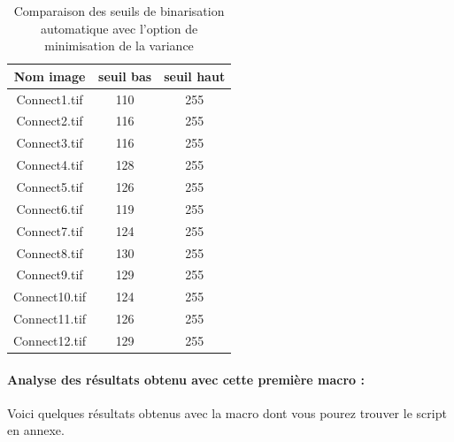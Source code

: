 \documentclass{scrreprt}
\begin{document}
\begin{table}[!h]
        \begin{center}
                \begin{tabular}{|c|c|c|}
                   \hline
                   Nom image & seuil bas & seuil haut \\
                   \hline
                   Connect1.tif & 110  & 255 \\
                   \hline
                   Connect2.tif & 116 & 255  \\
                   \hline
		   Connect3.tif & 116 & 255 \\
                   \hline 
		   Connect4.tif & 128 & 255 \\
                   \hline 
		   Connect5.tif & 126 & 255 \\
                   \hline 
		   Connect6.tif & 119 & 255 \\
                   \hline 
		   Connect7.tif & 124 & 255 \\
                   \hline 
		   Connect8.tif & 130 & 255 \\
                   \hline 
		   Connect9.tif & 129 & 255 \\
                   \hline 
		   Connect10.tif & 124 & 255 \\
		   \hline
 		   Connect11.tif & 126 & 255 \\
                   \hline
		   Connect12.tif & 129 & 255 \\
                   \hline 
 	
                \end{tabular}
        \end{center}
        \caption{Comparaison des seuils de binarisation automatique avec l'option de minimisation de la variance}
\end{table}

\paragraph{Analyse des résultats obtenu avec cette première macro : }
Voici quelques résultats obtenus avec la macro dont vous pourez trouver le script en annexe.
\end{document}
